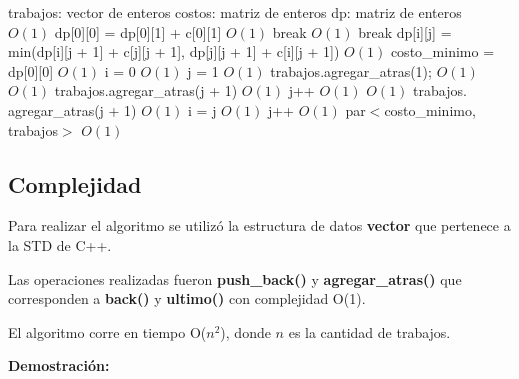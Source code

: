 \documentclass[a4paper, 10pt, twoside]{article}
\newenvironment{pseudo}[1][]{%
    \vspace{0.5em}%
    \begin{algorithmic}%
}
{%
    \end{algorithmic}%
    \vspace{0.5em}%
}
\newcommand{\Ode}[1]{\hfill $O(#1)$}
\begin{document}
\begin{pseudo}

\State trabajos: vector de enteros
\State costos: matriz de enteros
\State dp: matriz de enteros
\\
                             \Ode{1}
                \State dp[0][0] = dp[0][1] + c[0][1]  \Ode{1}
                \State break                          
            \EndIf
                                           \Ode{1}
                \State break
            \EndIf
            \State dp[i][j] = min(dp[i][j + 1] + c[j][j + 1], dp[j][j + 1] + c[i][j + 1])                          \Ode{1}
        \EndFor
    \EndFor
    \State costo\_minimo = dp[0][0]                    \Ode{1}
    \State i = 0                                       \Ode{1}
    \State j = 1                                       \Ode{1}
    \State trabajos$.$agregar\_atras(1);
            \Ode{1}
                \Ode{1}
            \State trabajos$.$agregar\_atras(j + 1)    \Ode{1}
            \State j++                                 \Ode{1}
            \EndIf
        \Else
                \Ode{1}
            \State trabajos$.$agregar\_atras(j + 1)    \Ode{1}
            \State i = j                               \Ode{1}  
            \State j++                                 \Ode{1}
            \EndIf
        \EndIf
    \EndWhile
    \Return par$<$costo\_minimo, trabajos$>$ \Ode{1}
    \EndProcedure
\end{pseudo}



\subsection{Complejidad}

Para realizar el algoritmo se utilizó la estructura de datos \textbf{vector} que pertenece a la STD de C++.

Las operaciones realizadas fueron \textbf{push\_back()} y \textbf{agregar\_atras()} que corresponden a \textbf{back()} y \textbf{ultimo()} con complejidad O(1).

El algoritmo corre en tiempo O($n^2$), donde $n$ es la cantidad de trabajos.

\textbf{Demostración: }
\end{document}
